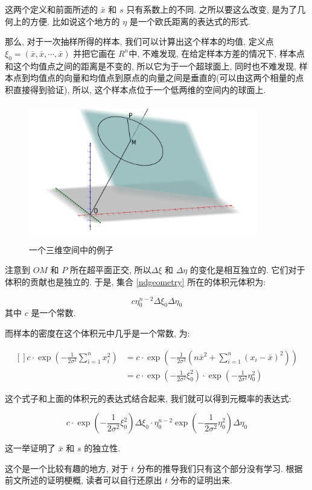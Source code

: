 			这两个定义和前面所述的 $\bar{x}$ 和 $s$ 只有系数上的不同. 之所以要这么改变, 是为了几何上的方便. 比如说这个地方的 $\eta$ 是一个欧氏距离的表达式的形式. 
			
			那么, 对于一次抽样所得的样本, 我们可以计算出这个样本的均值, 定义点 $\xi_0 = (\bar{x}, \bar{x}, \cdots, \bar{x})$ 并把它画在 $R^n$中, 不难发现, 在给定样本方差的情况下, 样本点和这个均值点之间的距离是不变的, 所以它为于一个超球面上, 同时也不难发现, 样本点到均值点的向量和均值点到原点的向量之间是垂直的(可以由这两个相量的点积直接得到验证), 所以, 这个样本点位于一个低两维的空间内的球面上. 
			
			\begin{figure}[h]
				\centering				
				\includegraphics[width=10cm, height = 6cm]{figures/ndgeometry}
				\caption{一个三维空间中的例子}
			\end{figure}
	
			
			注意到 $OM$ 和 $P$ 所在超平面正交, 所以$\Delta \xi$ 和 $\Delta \eta$ 的变化是相互独立的. 它们对于体积的贡献也是独立的. 于是, 集合 \ref{ndgeometry} 所在的体积元体积为:
			
			\begin{equation}
				c \eta_0^{n-2} \Delta \xi_0 \Delta \eta_0
			\end{equation}
			其中 $c$ 是一个常数. 
			
			而样本的密度在这个体积元中几乎是一个常数, 为:
			
			\begin{equation}
				\begin{aligned}[]
					c \cdot \exp\left(- \frac{1}{2\sigma^2} \sum_{i=1}^n x_i^2\right) & =
					c \cdot \exp\left(- \frac{1}{2\sigma^2}(n\bar{x}^2 + \sum_{i=1}^n(x_i -\bar{x})^2)\right) \\
					& = c \cdot \exp\left(-\frac{1}{2\sigma^2} \xi_0^2\right) \cdot \exp\left(-\frac{1}{2\sigma^2} \eta_0^2\right)
				\end{aligned}
			\end{equation}
			
			这个式子和上面的体积元的表达式结合起来, 我们就可以得到元概率的表达式:
			
			\begin{equation}
				c \cdot \exp \left(-\frac{1}{2\sigma^2} \xi_0^2\right) \Delta \xi_0 \cdot \eta_0^{n-2} \exp\left(-\frac{1}{2\sigma^2} \eta_0^2\right) \Delta \eta_0
			\end{equation}
			
			这一举证明了 $\bar{x}$ 和 $s$ 的独立性.
			
			这个是一个比较有趣的地方, 对于 $t$ 分布的推导我们只有这个部分没有学习. 根据前文所述的证明梗概, 读者可以自行还原出 $t$ 分布的证明出来.
